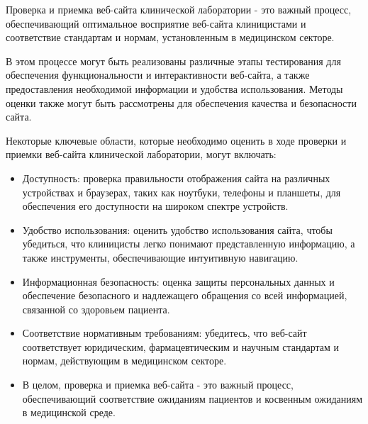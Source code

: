 Проверка и приемка веб-сайта клинической лаборатории - это важный процесс, обеспечивающий оптимальное восприятие веб-сайта клиницистами и соответствие стандартам и нормам, установленным в медицинском секторе.

В этом процессе могут быть реализованы различные этапы тестирования для обеспечения функциональности и интерактивности веб-сайта, а также предоставления необходимой информации и удобства использования. Методы оценки также могут быть рассмотрены для обеспечения качества и безопасности сайта.

Некоторые ключевые области, которые необходимо оценить в ходе проверки и приемки веб-сайта клинической лаборатории, могут включать:

\begin{itemize}
	\item Доступность: проверка правильности отображения сайта на различных устройствах и браузерах, таких как ноутбуки, телефоны и планшеты, для обеспечения его доступности на широком спектре устройств.
	\item Удобство использования: оценить удобство использования сайта, чтобы убедиться, что клиницисты легко понимают представленную информацию, а также инструменты, обеспечивающие интуитивную навигацию.
	\item Информационная безопасность: оценка защиты персональных данных и обеспечение безопасного и надлежащего обращения со всей информацией, связанной со здоровьем пациента.
	\item Соответствие нормативным требованиям: убедитесь, что веб-сайт соответствует юридическим, фармацевтическим и научным стандартам и нормам, действующим в медицинском секторе.
	\item В целом, проверка и приемка веб-сайта - это важный процесс, обеспечивающий соответствие ожиданиям пациентов и косвенным ожиданиям в медицинской среде.
\end{itemize}
